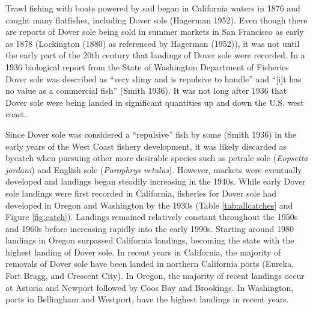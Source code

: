 \documentclass[11pt,
  english,
  a4paper,
]{article}
\begin{document}

Trawl fishing with boats powered by sail began in California waters in 1876 and caught many flatfishes, including Dover sole {(Hagerman 1952)\leavevmode\tagmcend\tagstructend}. Even though there are reports of Dover sole being sold in summer markets in San Francisco as early as 1878 (Lockington {(1880)\leavevmode\tagmcend\tagstructend} as referenced by Hagerman {(1952)\leavevmode\tagmcend\tagstructend}), it was not until the early part of the 20th century that landings of Dover sole were recorded. In a 1936 biological report from the State of Washington Department of Fisheries Dover sole was described as ``very slimy and is repulsive to handle'' and ``{[}i{]}t has no value as a commercial fish'' {(Smith 1936)\leavevmode\tagmcend\tagstructend}. It was not long after 1936 that Dover sole were being landed in significant quantities up and down the U.S. west coast.

\leavevmode\tagmcend\tagstructend\par


Since Dover sole was considered a ``repulsive'' fish by some {(Smith 1936)\leavevmode\tagmcend\tagstructend} in the early years of the West Coast fishery development, it was likely discarded as bycatch when pursuing other more desirable species such as petrale sole (\emph{Eopsetta jordani}) and English sole (\emph{Parophrys vetulus}). However, markets were eventually developed and landings began steadily increasing in the 1940s. While early Dover sole landings were first recorded in California, fisheries for Dover sole had developed in Oregon and Washington by the 1930s (Table \ref{tab:allcatches} and Figure \ref{fig:catch}). Landings remained relatively constant throughout the 1950s and 1960s before increasing rapidly into the early 1990s. Starting around 1980 landings in Oregon surpassed California landings, becoming the state with the highest landing of Dover sole. In recent years in California, the majority of removals of Dover sole have been landed in northern California ports (Eureka, Fort Bragg, and Crescent City). In Oregon, the majority of recent landings occur at Astoria and Newport followed by Coos Bay and Brookings. In Washington, ports in Bellingham and Westport, have the highest landings in recent years.
\end{document}
